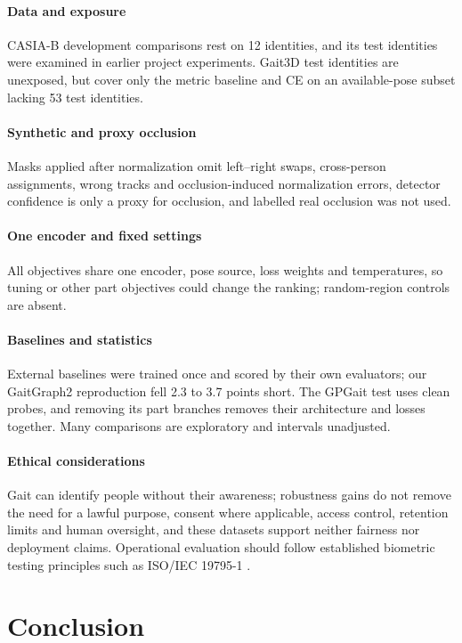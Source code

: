 \documentclass[journal]{IEEEtran}
\begin{document}
\paragraph{Data and exposure}
CASIA-B development comparisons rest on 12 identities, and its test identities
were examined in earlier project experiments. Gait3D test identities are
unexposed, but cover only the metric baseline and CE on an available-pose
subset lacking 53 test identities.

\paragraph{Synthetic and proxy occlusion}
Masks applied after normalization omit left--right swaps, cross-person
assignments, wrong tracks and occlusion-induced normalization errors, detector
confidence is only a proxy for occlusion, and labelled real occlusion was not
used.

\paragraph{One encoder and fixed settings}
All objectives share one encoder, pose source, loss weights and temperatures,
so tuning or other part objectives could change the ranking; random-region
controls are absent.

\paragraph{Baselines and statistics}
External baselines were trained once and scored by their own evaluators; our
GaitGraph2 reproduction fell 2.3 to 3.7 points short. The GPGait test uses clean
probes, and removing its part branches removes their architecture and losses
together. Many comparisons are exploratory and intervals unadjusted.

\paragraph{Ethical considerations}
Gait can identify people without their awareness; robustness gains do not
remove the need for a lawful purpose, consent where applicable, access control,
retention limits and human oversight, and these datasets support neither
fairness nor deployment claims. Operational evaluation should follow
established biometric testing principles such as ISO/IEC 19795-1
\cite{iso19795}.

\section{Conclusion}
\label{sec:conclusion}
\end{document}

